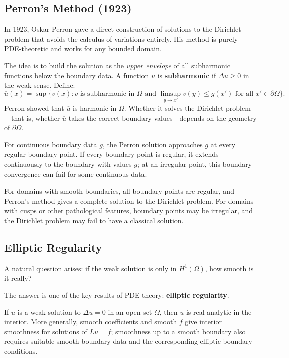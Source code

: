 \subsection{Perron's Method (1923)}

In 1923, Oskar Perron gave a direct construction of solutions to the Dirichlet problem that avoids the calculus of variations entirely. His method is purely PDE-theoretic and works for any bounded domain.

The idea is to build the solution as the \emph{upper envelope} of all subharmonic functions below the boundary data. A function $u$ is \textbf{subharmonic} if $\Delta u \geq 0$ in the weak sense. Define:
\[
    \overline{u}(x) = \sup\{v(x) : v \text{ is subharmonic in } \Omega \text{ and } \limsup_{y \to x'} v(y) \leq g(x') \text{ for all } x' \in \partial\Omega\}.
\]
Perron showed that $\overline{u}$ is harmonic in $\Omega$. Whether it solves the Dirichlet problem---that is, whether $\overline{u}$ takes the correct boundary values---depends on the geometry of $\partial\Omega$.

\begin{theorem}\label{thm:perron}
For continuous boundary data $g$, the Perron solution approaches $g$ at every regular boundary point. If every boundary point is regular, it extends continuously to the boundary with values $g$; at an irregular point, this boundary convergence can fail for some continuous data.
\end{theorem}

For domains with smooth boundaries, all boundary points are regular, and Perron's method gives a complete solution to the Dirichlet problem. For domains with cusps or other pathological features, boundary points may be irregular, and the Dirichlet problem may fail to have a classical solution.

\subsection{Elliptic Regularity}

A natural question arises: if the weak solution is only in $H^1(\Omega)$, how smooth is it really?

The answer is one of the key results of PDE theory: \textbf{elliptic regularity}.

\begin{theorem}\label{thm:elliptic-regularity}
If $u$ is a weak solution to $\Delta u = 0$ in an open set $\Omega$, then $u$ is real-analytic in the interior. More generally, smooth coefficients and smooth $f$ give interior smoothness for solutions of $Lu=f$; smoothness up to a smooth boundary also requires suitable smooth boundary data and the corresponding elliptic boundary conditions.
\end{theorem}

